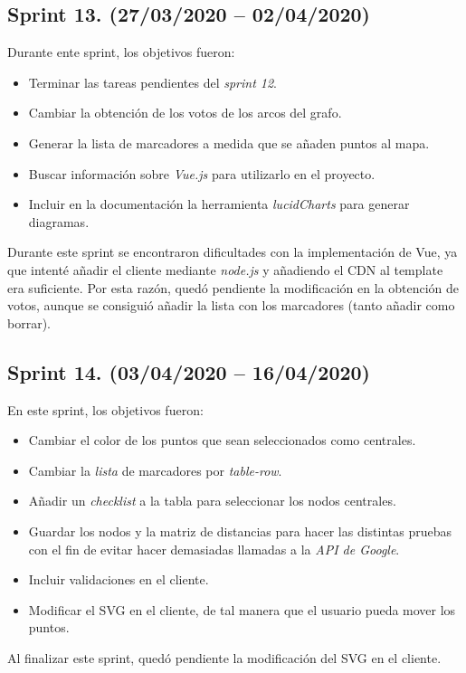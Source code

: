 \subsection{Sprint 13. (27/03/2020 -- 02/04/2020)}
Durante ente sprint, los objetivos fueron:
\begin{itemize}
	\item Terminar las tareas pendientes del \textit{sprint 12}.
	\item Cambiar la obtención de los votos de los arcos del grafo.
	\item Generar la lista de marcadores a medida que se añaden puntos al mapa.
	\item Buscar información sobre \textit{Vue.js} para utilizarlo en el proyecto.
	\item Incluir en la documentación la herramienta \textit{lucidCharts} para generar diagramas.
\end{itemize}
Durante este sprint se encontraron dificultades con la implementación de Vue, ya que intenté añadir el cliente mediante \textit{node.js} y añadiendo el CDN al template era suficiente. Por esta razón, quedó pendiente la modificación en la obtención de votos, aunque se consiguió añadir la lista con los marcadores (tanto añadir como borrar).

\subsection{Sprint 14. (03/04/2020 -- 16/04/2020)}
En este sprint, los objetivos fueron:
\begin{itemize}
	\item Cambiar el color de los puntos que sean seleccionados como centrales.
	\item Cambiar la \textit{lista} de marcadores por \textit{table-row}.
	\item Añadir un \textit{checklist} a la tabla para seleccionar los nodos centrales.
	\item Guardar los nodos y la matriz de distancias para hacer las distintas pruebas con el fin de evitar hacer demasiadas llamadas a la \textit{API de Google}.
	\item Incluir validaciones en el cliente.
	\item Modificar el SVG en el cliente, de tal manera que el usuario pueda mover los puntos.
\end{itemize}
Al finalizar este sprint, quedó pendiente la modificación del SVG en el cliente.

